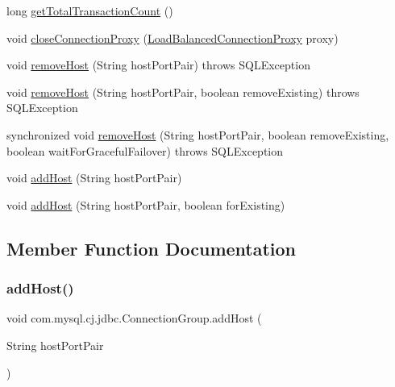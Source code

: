 \begin{DoxyCompactItemize}
\item 
long \mbox{\hyperlink{classcom_1_1mysql_1_1cj_1_1jdbc_1_1_connection_group_a05bf7e733b51d9a6d8bb300c96f547db}{get\+Total\+Transaction\+Count}} ()
\item 
void \mbox{\hyperlink{classcom_1_1mysql_1_1cj_1_1jdbc_1_1_connection_group_ad892402b4f3b73a6677ba6997f493bf6}{close\+Connection\+Proxy}} (\mbox{\hyperlink{classcom_1_1mysql_1_1cj_1_1jdbc_1_1ha_1_1_load_balanced_connection_proxy}{Load\+Balanced\+Connection\+Proxy}} proxy)
\item 
void \mbox{\hyperlink{classcom_1_1mysql_1_1cj_1_1jdbc_1_1_connection_group_a688ad628516ef76db003381b4180c175}{remove\+Host}} (String host\+Port\+Pair)  throws S\+Q\+L\+Exception 
\item 
void \mbox{\hyperlink{classcom_1_1mysql_1_1cj_1_1jdbc_1_1_connection_group_a129dcc7b87611dee38ad5f28ec59d1af}{remove\+Host}} (String host\+Port\+Pair, boolean remove\+Existing)  throws S\+Q\+L\+Exception 
\item 
synchronized void \mbox{\hyperlink{classcom_1_1mysql_1_1cj_1_1jdbc_1_1_connection_group_a2bfa53ec828966ecf49573250c11a4ca}{remove\+Host}} (String host\+Port\+Pair, boolean remove\+Existing, boolean wait\+For\+Graceful\+Failover)  throws S\+Q\+L\+Exception 
\item 
void \mbox{\hyperlink{classcom_1_1mysql_1_1cj_1_1jdbc_1_1_connection_group_a609c2dca88c1298e0bc1ec8cf019cfc6}{add\+Host}} (String host\+Port\+Pair)
\item 
void \mbox{\hyperlink{classcom_1_1mysql_1_1cj_1_1jdbc_1_1_connection_group_a6476527606a8bbf591d41745c3ab32ea}{add\+Host}} (String host\+Port\+Pair, boolean for\+Existing)
\end{DoxyCompactItemize}


\subsection{Member Function Documentation}
\mbox{\label{classcom_1_1mysql_1_1cj_1_1jdbc_1_1_connection_group_a609c2dca88c1298e0bc1ec8cf019cfc6}} 
\subsubsection{\texorpdfstring{add\+Host()}{addHost()}\hspace{0.1cm}{\footnotesize\ttfamily [1/2]}}
{\footnotesize\ttfamily void com.\+mysql.\+cj.\+jdbc.\+Connection\+Group.\+add\+Host (\begin{DoxyParamCaption}\item[{String}]{host\+Port\+Pair }\end{DoxyParamCaption})}

